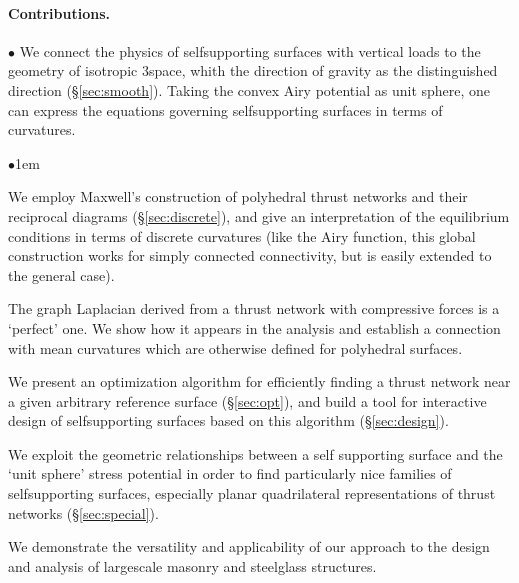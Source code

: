 \documentclass[annual]{acmsiggraph}
\newcommand{\secref}[1]{(\S\ref{#1})}
\begin{document}
\paragraph{Contributions.} 

$\bullet$ We connect the physics of self\dash supporting surfaces with
vertical loads to the geometry of isotropic 3\dash space, whith the
direction of gravity as the distinguished direction
\secref{sec:smooth}. Taking the convex Airy potential as
unit sphere, one can express the equations  
governing self\dash supporting surfaces in terms of curvatures.

\begin{list}{$\bullet$}{\itemindent1em}

\item We employ Maxwell's construction of polyhedral thrust networks
and their reciprocal diagrams \secref{sec:discrete}, and give
an interpretation of the equilibrium conditions in terms of
discrete curvatures (like the Airy function, this global construction
works for simply connected connectivity, but is easily extended to
the general case).

\item The graph Laplacian derived from a thrust network with compressive
forces is a `perfect' one. We show how it appears in the analysis and
establish a connection with mean curvatures which are otherwise defined
for polyhedral surfaces.

\item We present an optimization algorithm for efficiently finding
a thrust network near a given arbitrary reference surface \secref{sec:opt},
and build a tool for interactive design of self\dash supporting surfaces based
on this algorithm \secref{sec:design}.

\item We exploit the geometric relationships between a self\dash
supporting surface and the `unit sphere' stress potential in order
to find  particularly nice families of self\dash supporting surfaces,
especially planar quadrilateral representations  of thrust networks
\secref{sec:special}.

\item We demonstrate the versatility and applicability of
our approach to the design and analysis of large\dash scale masonry and
steel\dash glass structures.

\end{list}
\end{document}

